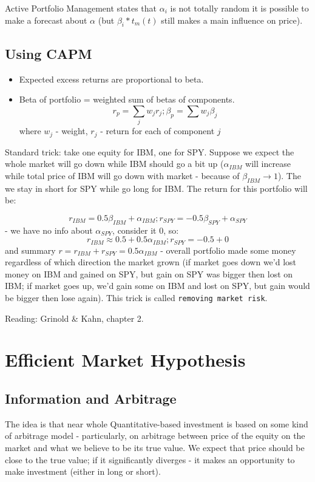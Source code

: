 \documentclass{scrartcl}
\newcommand{\term}[1]{\verb~#1~} %
\begin{document}
Active Portfolio Management states that $\alpha_i$ is not totally random it is
possible to make a forecast about $\alpha$ (but $\beta_i * t_m(t)$ still makes a
main influence on price).

\subsection{Using CAPM}
\label{sec:UsingCAPM}
\begin{itemize}
\item Expected excess returns are proportional to beta.
\item Beta of portfolio = weighted sum of betas of components.
$$r_p = \sum_j w_j r_j; \beta_p = \sum w_j \beta_j $$
where $w_j$ - weight, $r_j$ - return for each of component $j$
\end{itemize}
Standard trick: take one equity for IBM, one for SPY. Suppose we expect the
whole market will go down while IBM should go a bit up ($\alpha_{IBM}$ will
increase while total price of IBM will go down with market - because of
$\beta_{IBM} \to 1$). The we stay in short for SPY while go long for IBM. The
return for this portfolio will be:

$$r_{IBM} = 0.5 \beta_{IBM} + \alpha_{IBM}; r_{SPY} = - 0.5 \beta_{SPY} + \alpha_{SPY}$$
- we have no info about $\alpha_{SPY}$, consider it 0, so:
$$ r_{IBM} \approx 0.5 + 0.5 \alpha_{IBM};r_{SPY} = -0.5 + 0$$
and summary $r = r_{IBM} + r_{SPY} = 0.5 \alpha_{IBM}$ - overall portfolio made
some money regardless of which direction the market grown (if market goes down
we'd lost money on IBM and gained on SPY, but gain on SPY was bigger then lost
on IBM; if market goes up, we'd gain some on IBM and lost on SPY, but gain would
be bigger then lose again). This trick is called \term{removing market risk}.

Reading: Grinold \& Kahn, chapter 2.

\section{Efficient Market Hypothesis}
\label{sec:EfficientMarketHypothesis}
\subsection{Information and Arbitrage}
\label{sec:InformationAndArbitrage}
The idea is that near whole Quantitative-based investment is based on some kind
of arbitrage model - particularly, on arbitrage between price of the equity on
the market and what we believe to be its true value. We expect that price should
be close to the true value; if it significantly diverges - it makes an
opportunity to make investment (either in long or short).
\end{document}
